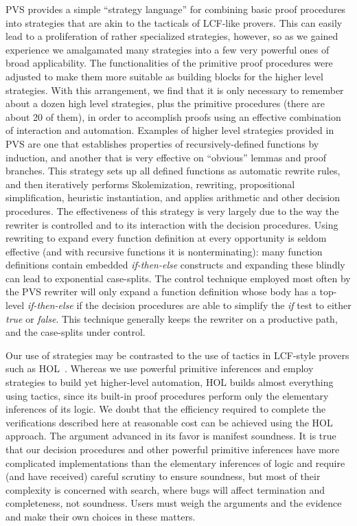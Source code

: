 PVS provides a simple ``strategy language'' for combining basic proof
procedures into strategies that are akin to the tacticals of LCF-like
provers.  This can easily lead to a proliferation of rather
specialized strategies, however, so as we gained experience we
amalgamated many strategies into a few very powerful ones of broad
applicability.  The functionalities of the primitive proof procedures
were adjusted to make them more suitable as building blocks for the
higher level strategies.  With this arrangement, we find that it is
only necessary to remember about a dozen high level strategies, plus
the primitive procedures (there are about 20 of them), in order to
accomplish proofs using an effective combination of interaction and
automation.  Examples of higher level strategies provided in PVS are
one that establishes properties of recursively-defined functions by
induction, and another that is very effective on ``obvious'' lemmas
and proof branches.  This strategy sets up all defined functions as
automatic rewrite rules, and then iteratively performs Skolemization,
rewriting, propositional simplification, heuristic instantiation, and
applies arithmetic and other decision procedures.  The
effectiveness of this strategy is very largely due to the way the
rewriter is controlled and to its interaction with the decision
procedures.  Using rewriting to expand every function definition
at every opportunity is seldom effective (and with recursive
functions it is nonterminating): many function definitions contain
embedded {\em if-then-else\/} constructs and expanding these blindly
can lead to exponential case-splits.  The control technique employed
most often by the PVS rewriter will only expand a function definition
whose body has a top-level {\em if-then-else\/} if the decision
procedures are able to simplify the {\em if\/} test to either {\em
true\/} or {\em false\/}.  This technique generally keeps the rewriter
on a productive path, and the case-splits under control.

Our use of strategies may be contrasted to the use of tactics in
LCF-style provers such as HOL~\cite{Gordon&Melham:HOL}.  Whereas we
use powerful primitive inferences and employ strategies to build yet
higher-level automation, HOL builds almost everything using tactics,
since its built-in proof procedures perform only the elementary
inferences of its logic.  We doubt that the efficiency required to
complete the verifications described here at reasonable cost can be
achieved using the HOL approach.  The argument advanced in its favor
is manifest soundness.  It is true that our decision procedures and
other powerful primitive inferences have more complicated
implementations than the elementary inferences of logic and require
(and have received) careful scrutiny to ensure soundness, but most of
their complexity is concerned with search, where bugs will affect
termination and completeness, not soundness.  Users must weigh the
arguments and the evidence and make their own choices in these
matters.

